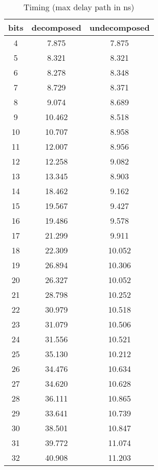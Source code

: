 \documentclass{article}
\begin{document}
\begin{table}[h]
\centering
\begin{tabular}{c | c | c }
bits	 & decomposed	 & undecomposed \\ 
\hline4	 & 7.875	 & 7.875 \\ 
5	 & 8.321	 & 8.321 \\ 
6	 & 8.278	 & 8.348 \\ 
7	 & 8.729	 & 8.371 \\ 
8	 & 9.074	 & 8.689 \\ 
9	 & 10.462	 & 8.518 \\ 
10	 & 10.707	 & 8.958 \\ 
11	 & 12.007	 & 8.956 \\ 
12	 & 12.258	 & 9.082 \\ 
13	 & 13.345	 & 8.903 \\ 
14	 & 18.462	 & 9.162 \\ 
15	 & 19.567	 & 9.427 \\ 
16	 & 19.486	 & 9.578 \\ 
17	 & 21.299	 & 9.911 \\ 
18	 & 22.309	 & 10.052 \\ 
19	 & 26.894	 & 10.306 \\ 
20	 & 26.327	 & 10.052 \\ 
21	 & 28.798	 & 10.252 \\ 
22	 & 30.979	 & 10.518 \\ 
23	 & 31.079	 & 10.506 \\ 
24	 & 31.556	 & 10.521 \\ 
25	 & 35.130	 & 10.212 \\ 
26	 & 34.476	 & 10.634 \\ 
27	 & 34.620	 & 10.628 \\ 
28	 & 36.111	 & 10.865 \\ 
29	 & 33.641	 & 10.739 \\ 
30	 & 38.501	 & 10.847 \\ 
31	 & 39.772	 & 11.074 \\ 
32	 & 40.908	 & 11.203 \\ 
\end{tabular}
\caption{Timing (max delay path in ns)}
\end{table}
\end{document}
